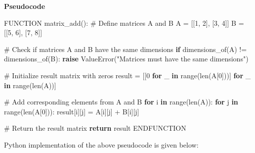 \documentclass[
  letterpaper,
  DIV=11,
  numbers=noendperiod]{scrreprt}
\newenvironment{Shaded}{\begin{snugshade}}{\end{snugshade}}
\newcommand{\BuiltInTok}[1]{\textcolor[rgb]{0.00,0.23,0.31}{#1}}
\newcommand{\CommentTok}[1]{\textcolor[rgb]{0.37,0.37,0.37}{#1}}
\newcommand{\ControlFlowTok}[1]{\textcolor[rgb]{0.00,0.23,0.31}{\textbf{#1}}}
\newcommand{\DecValTok}[1]{\textcolor[rgb]{0.68,0.00,0.00}{#1}}
\newcommand{\KeywordTok}[1]{\textcolor[rgb]{0.00,0.23,0.31}{\textbf{#1}}}
\newcommand{\NormalTok}[1]{\textcolor[rgb]{0.00,0.23,0.31}{#1}}
\newcommand{\OperatorTok}[1]{\textcolor[rgb]{0.37,0.37,0.37}{#1}}
\newcommand{\PreprocessorTok}[1]{\textcolor[rgb]{0.68,0.00,0.00}{#1}}
\newcommand{\StringTok}[1]{\textcolor[rgb]{0.13,0.47,0.30}{#1}}
\theoremstyle{plain}
\theoremstyle{definition}
\theoremstyle{remark}
\begin{document}
\textbf{Pseudocode}

\begin{Shaded}
\begin{Highlighting}[]
\NormalTok{FUNCTION matrix\_add():}
    \CommentTok{\# Define matrices A and B}
\NormalTok{    A }\OperatorTok{=}\NormalTok{ [[}\DecValTok{1}\NormalTok{, }\DecValTok{2}\NormalTok{], [}\DecValTok{3}\NormalTok{, }\DecValTok{4}\NormalTok{]]}
\NormalTok{    B }\OperatorTok{=}\NormalTok{ [[}\DecValTok{5}\NormalTok{, }\DecValTok{6}\NormalTok{], [}\DecValTok{7}\NormalTok{, }\DecValTok{8}\NormalTok{]]}

    \CommentTok{\# Check if matrices A and B have the same dimensions}
    \ControlFlowTok{if}\NormalTok{ dimensions\_of(A) }\OperatorTok{!=}\NormalTok{ dimensions\_of(B):}
         \ControlFlowTok{raise} \PreprocessorTok{ValueError}\NormalTok{(}\StringTok{"Matrices must have the same dimensions"}\NormalTok{)}

    \CommentTok{\# Initialize result matrix with zeros}
\NormalTok{    result }\OperatorTok{=}\NormalTok{ [[}\DecValTok{0} \ControlFlowTok{for}\NormalTok{ \_ }\KeywordTok{in} \BuiltInTok{range}\NormalTok{(}\BuiltInTok{len}\NormalTok{(A[}\DecValTok{0}\NormalTok{]))] }\ControlFlowTok{for}\NormalTok{ \_ }\KeywordTok{in} \BuiltInTok{range}\NormalTok{(}\BuiltInTok{len}\NormalTok{(A))]}

    \CommentTok{\# Add corresponding elements from A and B}
    \ControlFlowTok{for}\NormalTok{ i }\KeywordTok{in} \BuiltInTok{range}\NormalTok{(}\BuiltInTok{len}\NormalTok{(A)):}
        \ControlFlowTok{for}\NormalTok{ j }\KeywordTok{in} \BuiltInTok{range}\NormalTok{(}\BuiltInTok{len}\NormalTok{(A[}\DecValTok{0}\NormalTok{])):}
\NormalTok{            result[i][j] }\OperatorTok{=}\NormalTok{ A[i][j] }\OperatorTok{+}\NormalTok{ B[i][j]}

\CommentTok{\# Return the result matrix}
    \ControlFlowTok{return}\NormalTok{ result}
\NormalTok{ENDFUNCTION}
\end{Highlighting}
\end{Shaded}

Python implementation of the above pseudocode is given below:
\end{document}
